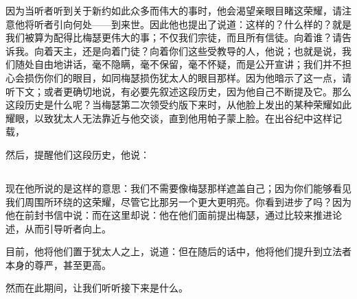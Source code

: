 \par

因为当听者听到关于新约如此众多而伟大的事时，他会渴望亲眼目睹这荣耀，请注意他将听者引向何处——到来世。因此他也提出了说道：这样的？什么样的？就是我们被算为配得比梅瑟更伟大的事；不仅我们宗徒，而且所有信徒。向着谁？请告诉我。向着天主，还是向着门徒？向着你们这些受教导的人，他说；也就是说，我们随处自由地讲话，毫不隐瞒，毫不保留，毫不怀疑，而是公开宣讲；我们并不担心会损伤你们的眼目，如同梅瑟损伤犹太人的眼目那样。因为他暗示了这一点，请听下文；或者更确切地说，有必要先叙述这段历史，因为他自己不断提及它。那么这段历史是什么呢？当梅瑟第二次领受约版下来时，从他脸上发出的某种荣耀如此耀眼，以致犹太人无法靠近与他交谈，直到他用帕子蒙上脸。在出谷纪中这样记载， \par

然后，提醒他们这段历史，他说：\par


\subsection{}

\par

现在他所说的是这样的意思：我们不需要像梅瑟那样遮盖自己；因为你们能够看见我们周围所环绕的这荣耀，尽管它比那另一个更大更明亮。你看到进步了吗？因为他在前封书信中说：而在这里却说：他在他们面前提出梅瑟，通过比较来推进论述，从而引导听者向上。\par

目前，他将他们置于犹太人之上，说道：但在随后的话中，他将他们提升到立法者本身的尊严，甚至更高。\par

然而在此期间，让我们听听接下来是什么。\par



